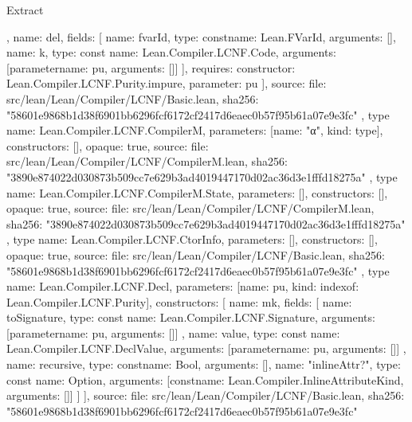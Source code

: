 \begin{lexlean}{Extract}
\begin{toolingmodule}
{{{        },
        {
          name: del,
          fields: [
            {name: fvarId, type: const{name: Lean.FVarId, arguments: []}},
            {
              name: k,
              type: const{
                name: Lean.Compiler.LCNF.Code,
                arguments: [parameter{name: pu, arguments: []}]
              }
            }
          ],
          requires: {constructor: Lean.Compiler.LCNF.Purity.impure, parameter: pu}
        }
      ],
      source: {
        file: src/lean/Lean/Compiler/LCNF/Basic.lean,
        sha256: "58601e9868b1d38f6901bb6296fcf6172cf2417d6eaec0b57f95b61a07e9e3fc"
      }
    },
    type{
      name: Lean.Compiler.LCNF.CompilerM,
      parameters: [{name: "α", kind: type{}}],
      constructors: [],
      opaque: true,
      source: {
        file: src/lean/Lean/Compiler/LCNF/CompilerM.lean,
        sha256: "3890e874022d030873b509cc7e629b3ad4019447170d02ac36d3e1fffd18275a"
      }
    },
    type{
      name: Lean.Compiler.LCNF.CompilerM.State,
      parameters: [],
      constructors: [],
      opaque: true,
      source: {
        file: src/lean/Lean/Compiler/LCNF/CompilerM.lean,
        sha256: "3890e874022d030873b509cc7e629b3ad4019447170d02ac36d3e1fffd18275a"
      }
    },
    type{
      name: Lean.Compiler.LCNF.CtorInfo,
      parameters: [],
      constructors: [],
      opaque: true,
      source: {
        file: src/lean/Lean/Compiler/LCNF/Basic.lean,
        sha256: "58601e9868b1d38f6901bb6296fcf6172cf2417d6eaec0b57f95b61a07e9e3fc"
      }
    },
    type{
      name: Lean.Compiler.LCNF.Decl,
      parameters: [{name: pu, kind: index{of: Lean.Compiler.LCNF.Purity}}],
      constructors: [
        {
          name: mk,
          fields: [
            {
              name: toSignature,
              type: const{
                name: Lean.Compiler.LCNF.Signature,
                arguments: [parameter{name: pu, arguments: []}]
              }
            },
            {
              name: value,
              type: const{
                name: Lean.Compiler.LCNF.DeclValue,
                arguments: [parameter{name: pu, arguments: []}]
              }
            },
            {name: recursive, type: const{name: Bool, arguments: []}},
            {
              name: "inlineAttr?",
              type: const{
                name: Option,
                arguments: [const{name: Lean.Compiler.InlineAttributeKind, arguments: []}]
              }
            }
          ]
        }
      ],
      source: {
        file: src/lean/Lean/Compiler/LCNF/Basic.lean,
        sha256: "58601e9868b1d38f6901bb6296fcf6172cf2417d6eaec0b57f95b61a07e9e3fc"
}}}
\end{toolingmodule}
\end{lexlean}
